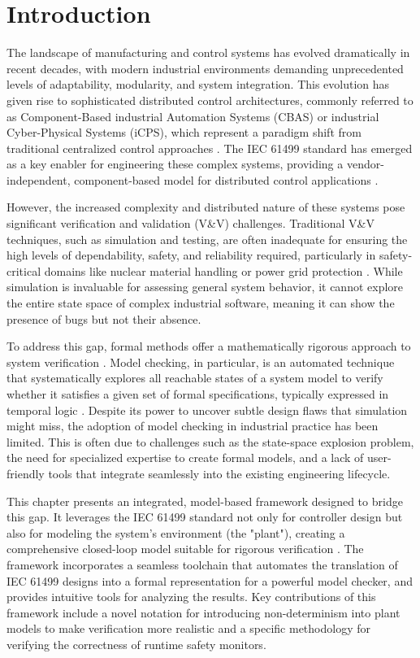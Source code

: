 \section{Introduction}\label{sec:introduction}

The landscape of manufacturing and control systems has evolved dramatically in recent decades, with modern industrial environments demanding unprecedented levels of adaptability, modularity, and system integration. This evolution has given rise to sophisticated distributed control architectures, commonly referred to as Component-Based industrial Automation Systems (CBAS) or industrial Cyber-Physical Systems (iCPS), which represent a paradigm shift from traditional centralized control approaches \cite{lee2017introduction}. The IEC 61499 standard has emerged as a key enabler for engineering these complex systems, providing a vendor-independent, component-based model for distributed control applications \cite{iec61499}.

However, the increased complexity and distributed nature of these systems pose significant verification and validation (V\&V) challenges. Traditional V\&V techniques, such as simulation and testing, are often inadequate for ensuring the high levels of dependability, safety, and reliability required, particularly in safety-critical domains like nuclear material handling or power grid protection \cite{sinha2019survey}. While simulation is invaluable for assessing general system behavior, it cannot explore the entire state space of complex industrial software, meaning it can show the presence of bugs but not their absence.

To address this gap, formal methods offer a mathematically rigorous approach to system verification \cite{clarke1999}. Model checking, in particular, is an automated technique that systematically explores all reachable states of a system model to verify whether it satisfies a given set of formal specifications, typically expressed in temporal logic \cite{emerson1985decision}. Despite its power to uncover subtle design flaws that simulation might miss, the adoption of model checking in industrial practice has been limited. This is often due to challenges such as the state-space explosion problem, the need for specialized expertise to create formal models, and a lack of user-friendly tools that integrate seamlessly into the existing engineering lifecycle.

This chapter presents an integrated, model-based framework designed to bridge this gap. It leverages the IEC 61499 standard not only for controller design but also for modeling the system's environment (the "plant"), creating a comprehensive closed-loop model suitable for rigorous verification \cite{vyatkin2008closed}. The framework incorporates a seamless toolchain that automates the translation of IEC 61499 designs into a formal representation for a powerful model checker, and provides intuitive tools for analyzing the results. Key contributions of this framework include a novel notation for introducing non-determinism into plant models to make verification more realistic and a specific methodology for verifying the correctness of runtime safety monitors.

